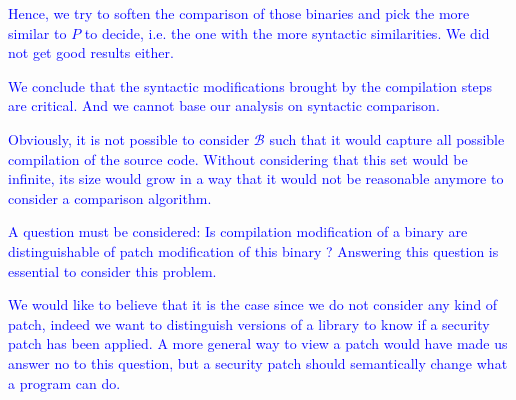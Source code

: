 \documentclass{article}
\newcommand{\ludo}[1]{\textcolor{blue}{#1}}
\begin{document}
    \ludo{Hence, we try to soften the comparison of those binaries and pick
    the more similar to $P$ to decide, i.e. the one with the more syntactic
    similarities. We did not get good results either.}

    \ludo{We conclude that the syntactic modifications brought by the compilation steps
    are critical. And we cannot base our analysis on syntactic comparison.}


%
    
    \ludo{Obviously, it is not possible to consider $\mathcal{B}$ such that it
    would capture all possible compilation of the source code. Without
    considering that this set would be infinite, its size would grow in a way
    that it would not be reasonable anymore to consider a comparison algorithm.}

    \ludo{A question must be considered: Is compilation modification of a
    binary are distinguishable of patch modification of this binary ?
    Answering this question is essential to consider this problem.}

    \ludo{We would like to believe that it is the case since we do not
    consider any kind of patch, indeed we want to distinguish versions of a
    library to know if a security patch has been applied. A more general way
    to view a patch would have made us answer no to this question, but a
    security patch should semantically change what a program can do.}
\end{document}
